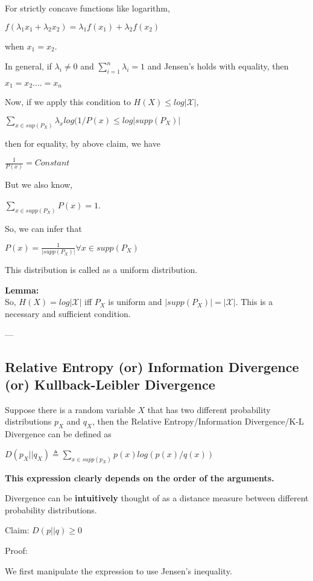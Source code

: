 \documentclass{article}
\begin{document}
For strictly concave functions like logarithm,

$f(\lambda_1x_1 + \lambda_2x_2) = \lambda_1f(x_1) +\lambda_2f(x_2)$

when $x_1 = x_2$.

In general, if $\lambda_i \not ={0}$ and $\sum_{i = 1}^{n} \lambda_i = 1$ and Jensen's holds with equality, then

$x_1 = x_2....=x_n$

Now, if we apply this condition to $H(X) \leq log|\mathcal{X}|$,

$\displaystyle\sum_{x\in sup(P_X)}\lambda_x log(1/P(x) \leq log|supp(P_X)|$

then for equality, by above claim, we have

$\frac{1}{P(x)} = Constant$

But we also know,

$\displaystyle\sum_{x\in supp(P_X)}{P(x)} = 1$.

So, we can infer that

$P(x) = \frac{1}{|supp(P_X)|} \forall x \in supp(P_X)$

This distribution is called as a uniform distribution.

\textbf{Lemma:}\\
So, $H(X) = log|\mathcal{X}|$ iff $P_X$ is uniform and $|supp(P_X)| = |\mathcal{X}|$. This is a necessary and sufficient condition.

---

\subsection{Relative Entropy (or) Information Divergence (or) Kullback-Leibler Divergence} 

Suppose there is a random variable $X$ that has two different probability distributions $p_X$ and $q_X$, then the Relative Entropy/Information Divergence/K-L Divergence can be defined as

$D(p_X||q_X) \triangleq \displaystyle\sum_{x\in supp(p_X)} p(x) log(p(x)/q(x))$

\textbf{This expression clearly depends on the order of the arguments.}

Divergence can be \textbf{intuitively} thought of as a distance measure between different probability distributions.

Claim: $D(p||q) \geq 0$

Proof:

We first manipulate the expression to use Jensen's inequality.
\end{document}
